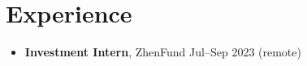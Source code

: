 \documentclass[10pt]{article}
\begin{document}

\section*{Experience}
\begin{itemize}
    \item \textbf{Investment Intern}, ZhenFund \hfill Jul--Sep 2023 (remote)
\end{itemize}
\end{document}
